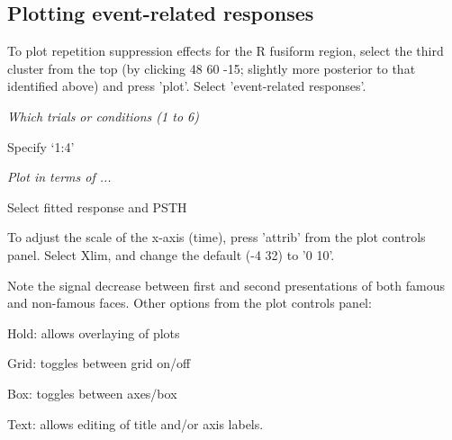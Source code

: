 \subsection{Plotting event-related responses}

To plot repetition suppression effects for the R fusiform region, select the third cluster from the top (by clicking 48 60 -15; slightly more posterior to that identified above) and press 'plot'. Select  'event-related responses'.

\bi
\item{\em Which trials or conditions (1 to 6)}
\item{Specify `1:4'}
\item{\em Plot in terms of ...}
\item{Select fitted response and PSTH}
\ei

To adjust the scale of the x-axis (time), press 'attrib' from the plot controls panel. Select Xlim, and change the default (-4 32) to '0 10'.

Note the signal decrease between first and second presentations of both famous and non-famous faces. Other options from the plot controls panel:

\bi
\item{Hold: allows overlaying of plots}
\item{Grid: toggles between grid on/off}
\item{Box: toggles between axes/box}
\item{Text: allows editing of title and/or axis labels.}
\ei

